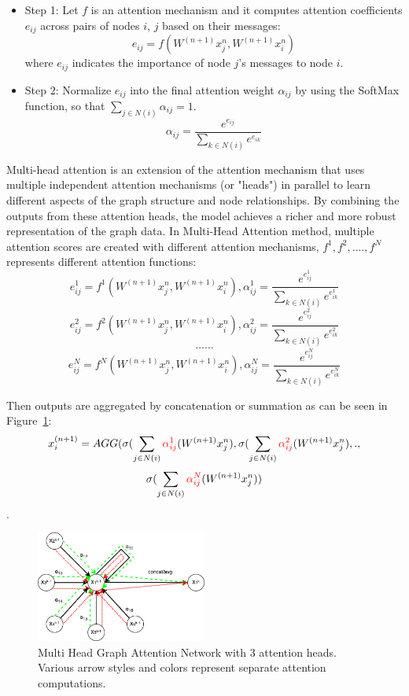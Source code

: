\begin{itemize}
  \item Step 1: Let $f$ is an attention mechanism and it computes attention coefficients $e_{ij}$ across pairs of nodes $i$, $j$ based on their messages: $$ e_{ij} = f(W^{(n+1)}x_j^n, W^{(n+1)}x_i^n) $$ where $e_{ij}$ indicates the importance of node $j$’s messages to node $i$.
  \item Step 2: Normalize $e_{ij}$ into the final attention weight $\alpha_{ij}$ by using the SoftMax function, so that $\sum_{j \in N(i)} \alpha_{ij} = 1 $. $$ \alpha_{ij} = \frac{e^{e_{ij}}}{\sum_{k \in N(i)} e^{e_{ik}}} $$
\end{itemize}


Multi-head attention is an extension of the attention mechanism that uses multiple independent attention mechanisms (or "heads") in parallel to learn different aspects of the graph structure and node relationships.
By combining the outputs from these attention heads, the model achieves a richer and more robust representation of the graph data.
In Multi-Head Attention method, multiple attention scores are created with different attention mechanisms, $ f^1, f^2, .... , f^N $ represents different attention functions: $$ e_{ij}^1 = f^1(W^{(n+1)}x_j^n, W^{(n+1)}x_i^n), \alpha_{ij}^1 = \frac{e^{e_{ij}^1}}{\sum_{k \in N(i)} e^{e_{ik}^1}} $$ $$ e_{ij}^2 = f^2(W^{(n+1)}x_j^n, W^{(n+1)}x_i^n), \alpha_{ij}^2 = \frac{e^{e_{ij}^2}}{\sum_{k \in N(i)} e^{e_{ik}^2}} $$ $$ ...... $$ $$ e_{ij}^N = f^N(W^{(n+1)}x_j^n, W^{(n+1)}x_i^n), \alpha_{ij}^N = \frac{e^{e_{ij}^N}}{\sum_{k \in N(i)} e^{e_{ik}^N}} $$


Then outputs are aggregated by concatenation or summation as can be seen in Figure~\ref{fig:mh-gat}: $$ x_i^{(n+1)} = AGG(\sigma(\sum_{j \in N(i)} \textcolor{red}{\alpha_{ij}^1}(W^{(n+1)}x_j^n), \sigma(\sum_{j \in N(i)} \textcolor{red}{\alpha_{ij}^2}(W^{(n+1)}x_j^n), . ,$$ $$ \sigma(\sum_{j \in N(i)} \textcolor{red}{\alpha_{ij}^N}(W^{(n+1)}x_j^n)) $$
.
\begin{figure}[htb!]
    \centering
    \includegraphics[width=0.5\textwidth]{figures/MH GAT.drawio}
    \caption{Multi Head Graph Attention Network with 3 attention heads. Various arrow styles and colors represent separate attention computations.}
    \label{fig:mh-gat}
\end{figure}


